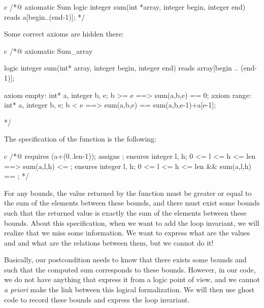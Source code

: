 \documentclass[middle]{zmdocument}
\begin{document}
\begin{CodeBlock}{c}
/*@ axiomatic Sum {
  logic integer sum(int *array, integer begin, integer end) reads a[begin..(end-1)];
}*/
\end{CodeBlock}



Some correct axioms are hidden there:



\begin{Spoiler}
\begin{CodeBlock}{c}
/*@
  axiomatic Sum_array{
    logic integer sum(int* array, integer begin, integer end) reads array[begin .. (end-1)];
   
    axiom empty: 
      \forall int* a, integer b, e; b >= e ==> sum(a,b,e) == 0;
    axiom range:
      \forall int* a, integer b, e; b < e ==> sum(a,b,e) == sum(a,b,e-1)+a[e-1];
  }
*/
\end{CodeBlock}
\end{Spoiler}


The specification of the function is the following:



\begin{CodeBlock}{c}
/*@ 
  requires \valid(a+(0..len-1));
  assigns \nothing;
  ensures \forall integer l, h;  0 <= l <= h <= len ==> sum(a,l,h) <= \result;
  ensures \exists integer l, h;  0 <= l <= h <= len &&  sum(a,l,h) == \result;
*/
\end{CodeBlock}



For any bounds, the value returned by the function must be greater or
equal to the sum of the elements between these bounds, and there must
exist some bounds such that the returned value is exactly the sum of the
elements between these bounds. About this specification, when we want to
add the loop invariant, we will realize that we miss some information.
We want to express what are the values  and  and
what are the relations between them, but we cannot do it!

Basically, our postcondition needs to know that there exists some bounds
 and  such that the computed sum corresponds to
these bounds. However, in our code, we do not have anything that express
it from a logic point of view, and we cannot \emph{a priori} make the
link between this logical formalization. We will then use ghost code to
record these bounds and express the loop invariant.
\end{document}
